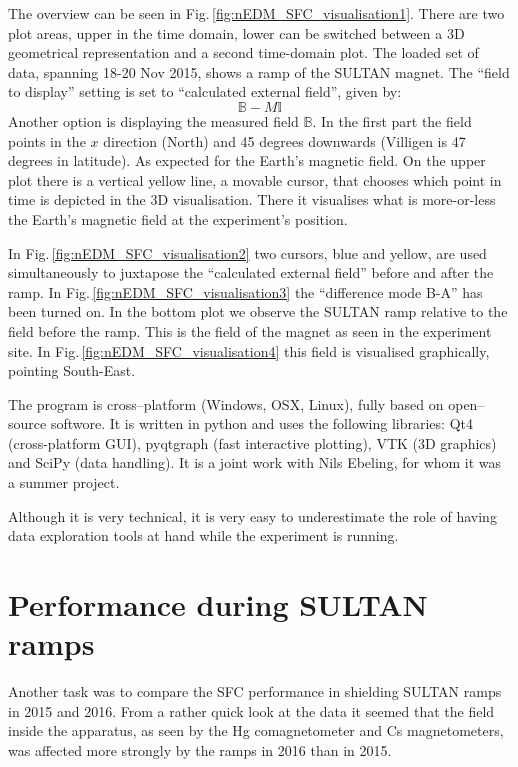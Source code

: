 The overview can be seen in Fig.\,\ref{fig:nEDM_SFC_visualisation1}. There are two plot areas, upper in the time domain, lower can be switched between a 3D geometrical representation and a second time-domain plot. The loaded set of data, spanning 18-20 Nov 2015, shows a ramp of the SULTAN magnet. The ``field to display'' setting is set to ``calculated external field'', given by:
\begin{equation}
  \mathbb{B} - M \mathbb{I}
\end{equation}
Another option is displaying the measured field $\mathbb{B}$.
In the first part the field points in the $x$ direction (North) and 45 degrees downwards (Villigen is 47 degrees in latitude). As expected for the Earth's magnetic field. On the upper plot there is a vertical yellow line, a movable cursor, that chooses which point in time is depicted in the 3D visualisation. There it visualises what is more-or-less the Earth's magnetic field at the experiment's position.

In Fig.\,\ref{fig:nEDM_SFC_visualisation2} two cursors, blue and yellow, are used simultaneously to juxtapose the ``calculated external field'' before and after the ramp. In Fig.\,\ref{fig:nEDM_SFC_visualisation3} the ``difference mode B-A'' has been turned on. In the bottom plot we observe the SULTAN ramp relative to the field before the ramp. This is the field of the magnet as seen in the experiment site. In Fig.\,\ref{fig:nEDM_SFC_visualisation4} this field is visualised graphically, pointing South-East.


The program is cross--platform (Windows, OSX, Linux), fully based on open--source softwore. It is written in python and uses the following libraries: Qt4 (cross-platform GUI), pyqtgraph (fast interactive plotting), VTK (3D graphics) and SciPy (data handling). It is a joint work with Nils Ebeling, for whom it was a summer project.

Although it is very technical, it is very easy to underestimate the role of having data exploration tools at hand while the experiment is running.



\section{Performance during SULTAN ramps}
Another task was to compare the SFC performance in shielding SULTAN ramps in 2015 and 2016. From a rather quick look at the data it seemed that the field inside the apparatus, as seen by the Hg comagnetometer and Cs magnetometers, was affected more strongly by the ramps in 2016 than in 2015.

